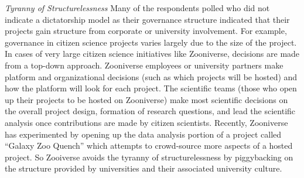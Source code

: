 {\it Tyranny of Structurelessness} Many of the respondents polled who did not indicate a dictatorship model as their governance structure indicated that their projects gain structure from corporate or university involvement.  For example, governance in citizen science projects varies largely due to the size of the project. In cases of very large citizen science initiatives like Zooniverse, decisions are made from a top-down approach. Zooniverse employees or university partners make platform and organizational decisions (such as which projects will be hosted) and how the platform will look for each project. The scientific teams (those who open up their projects to be hosted on Zooniverse) make most scientific decisions on the overall project design, formation of research questions, and lead the scientific analysis once contributions are made by citizen scientists. Recently, Zooniverse has experimented by opening up the data analysis portion of a project called “Galaxy Zoo Quench” which attempts to crowd-source more aspects of a hosted project. So Zooiverse avoids the tyranny of structurelessness by piggybacking on the structure provided by universities and their associated university culture.


